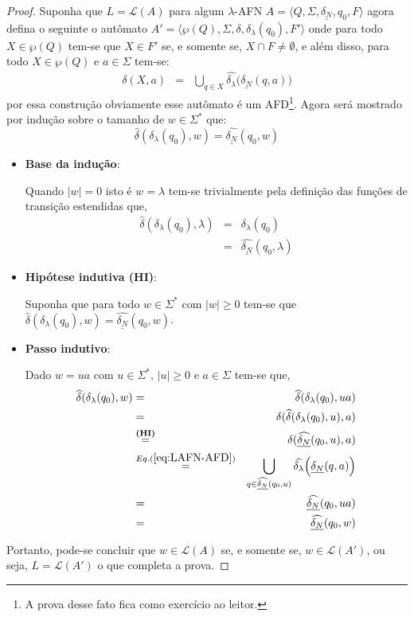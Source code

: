\begin{proof}
	Suponha que $L = \mathcal{L}(A)$ para algum $\lambda$-AFN $A =  \langle Q, \Sigma, \underline{\delta_N}, q_0, F \rangle$ agora defina o seguinte o autômato $A' = \langle \wp(Q), \Sigma, \delta, \delta_\lambda(q_0), F' \rangle$ onde para todo $X \in \wp(Q)$ tem-se que $X \in F'$ se, e somente se, $X \cap F \neq \emptyset$, e além disso, para todo $X \in \wp(Q)$ e $a \in \Sigma$ tem-se:
	\begin{eqnarray}\label{eq:LAFN-AFD}
		\delta(X, a) & = & \bigcup_{q \in X} \widehat{\delta_\lambda}\Big(\underline{\delta_N}(q, a)\Big)
	\end{eqnarray}
	por essa construção obviamente esse autômato é um AFD\footnote{A prova desse fato fica como exercício ao leitor.}. Agora será mostrado por indução sobre o tamanho de $w \in \Sigma^*$ que:
	$$\widehat{\delta}(\delta_\lambda(q_0), w) = \widehat{\underline{\delta_N}}(q_0, w)$$
	\begin{itemize}
		\item \textbf{Base da indução}:
		
		Quando $|w| = 0$ isto é $w = \lambda$ tem-se trivialmente pela definição das funções de transição estendidas que, 
		\begin{eqnarray*}
			\widehat{\delta}(\delta_\lambda(q_0), \lambda) & = & \delta_\lambda(q_0)\\
			& = & \widehat{\underline{\delta_N}}(q_0, \lambda)
		\end{eqnarray*}
		
		\item \textbf{Hipótese indutiva (HI)}:
		
		Suponha que para todo $w \in \Sigma^*$ com $|w| \geq 0$ tem-se que $\widehat{\delta}(\delta_\lambda(q_0), w) = \widehat{\underline{\delta_N}}(q_0, w)$.
		\item \textbf{Passo indutivo}:
		
		Dado $w = ua$ com $u \in \Sigma^*$, $|u| \geq 0$ e $a \in \Sigma$ tem-se que, 
		\begin{eqnarray*}
			\widehat{\delta}(\delta_\lambda(q_0), w) & = & \widehat{\delta}(\delta_\lambda(q_0), ua)\\
			& = & \delta(\widehat{\delta}(\delta_\lambda(q_0), u), a)\\
			& \stackrel{\textbf{(HI)}}{=} & \delta(\widehat{\underline{\delta_N}}(q_0, u), a)\\
			& \stackrel{Eq. (\ref{eq:LAFN-AFD})}{=} & \bigcup_{q \in \widehat{\underline{\delta_N}}(q_0, u)} \widehat{\delta_\lambda}\Big(\underline{\delta_N}(q, a)\Big)\\
			& = & \widehat{\underline{\delta_N}}(q_0, ua)\\
			& = & \widehat{\underline{\delta_N}}(q_0, w)
		\end{eqnarray*}
	\end{itemize}
	Portanto, pode-se concluir que $w \in \mathcal{L}(A)$ se, e somente se, $w \in \mathcal{L}(A')$, ou seja, $L = \mathcal{L}(A')$ o que completa a prova.
\end{proof}

